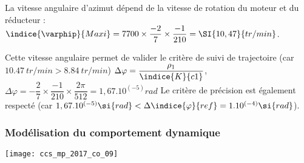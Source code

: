\ifprof
\begin{corrige}
La vitesse angulaire d’azimut dépend de la vitesse de rotation du moteur et du réducteur : 
$\indice{\varphip}{Maxi} = 7 700 \times \dfrac{-2}{7}\times \dfrac{-1}{210} =\SI{10,47}{tr/min}$.

Cette vitesse angulaire permet de valider le critère de suivi de trajectoire (car $\SI{10,47}{tr/min}>\SI{8,84}{tr/min}$)
$\Delta\varphi= \dfrac{\rho_1}{\indice{K}{c1}}$, $\Delta\varphi= -\dfrac{2}{7}\times \dfrac{-1}{210}\times\dfrac{2  \pi}{512}=1,67.10^{(-5)}\si{rad}$  
Le critère de précision est également respecté (car $1,67.10^{(-5)}\si{rad} <\Delta\indice{\varphi}{ref}=1.10^{(-4)} \si{rad}$).

\end{corrige}
\else
\fi


\subsubsection{Modélisation du comportement dynamique}

\ifprof
\begin{corrige}
\begin{center}

\texttt{[image: ccs\_mp\_2017\_co\_09]}

\end{center}
\end{corrige}
\else
\fi


